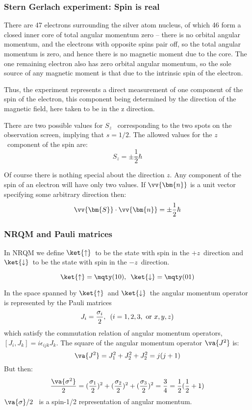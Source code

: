 \begin{frame}

\frametitle{Stern Gerlach experiment: Spin is real}

There are 47 electrons surrounding the silver atom nucleus, of which 46 form a closed inner core of total angular momentum zero -- there is no orbital angular momentum, and the electrons with opposite spins pair off, so the total angular momentum is zero, and hence there is no magnetic moment due to the core. The one remaining electron also has zero orbital angular momentum, \alert{so the sole source of any magnetic moment is that due to the intrinsic spin of the electron.}
 
Thus, the experiment represents a direct measurement of one component of the spin of the electron, this component being determined by the direction of the magnetic field, here taken to be in the z direction.

There are two possible values for $S_z$~ corresponding to the two spots on the observation screen, implying that $s = 1/2$. The allowed values for the $z$~component of the spin are:
\[
S_z = \pm \frac{1}{2}\hbar
\]

Of course there is nothing special about the direction $z$. Any component of the spin of an electron will have only two values. If $\vv{\bm{n}}$ is a unit vector specifying some arbitrary direction then:
\[
\vv{\bm{S}} \cdot \vv{\bm{n}} = \pm \frac{1}{2}\hbar
\]
\end{frame}

\begin{frame}
\frametitle{NRQM and Pauli matrices}

In NRQM we define $\ket{\uparrow}$~to be the state with spin in the $+z$~direction and 
$\ket{\downarrow}$~to be the state with spin in the $-z$~direction.
 
\[
\ket{\uparrow} = \mqty(1\\0), \,\,\, \ket{\downarrow} = \mqty(0\\1)
\]

In the space spanned by $\ket{\uparrow}$~and $\ket{\downarrow}$~the angular momentum operator is represented by the Pauli matrices
\[
J_i =\frac{\sigma_i}{2}, \,\,\, (i=1,2,3, ~{\rm or}~x,y,z)
\]
which satisfy the commutation relation of angular momentum operators, 
$[J_i, J_k] = i \epsilon_{ijk} J_k$. The square of the angular momentum operator $\va{J^2}$ is:
\[
\va{J^2} =J_1^2 + J_2^2 + J_2^2 = j(j+1)
\]
But then: 
\[
\frac{\va{\sigma^2}}{2} =(\frac{\sigma_1}{2})^2 + (\frac{\sigma_2}{2})^2 + (\frac{\sigma_3}{2})^2 
= \frac{3}{4} = \frac{1}{2}(\frac{1}{2} + 1)
\]
$\va{\sigma}/2$~ is  a spin-1/2 representation of angular momentum.
\end{frame}

